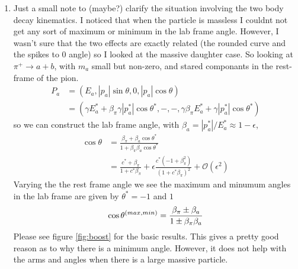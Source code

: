 \documentclass[11pt, a4paper]{article}
\begin{document}
\begin{enumerate}
\item Just a small note to (maybe?) clarify the situation involving the two body decay kinematics. I noticed that when the particle is massless I couldnt not get any sort of maximum or minimum in the lab frame angle. However, I wasn't sure that the two effects are exactly related (the rounded curve and the spikes to 0 angle) so I looked at the massive daughter case. So looking at $\pi^+ \rightarrow a+b$, with $m_a$ small but non-zero, and stared componants in the rest-frame of the pion.
	\begin{align}
		P_a &= (E_a, |p_a| \sin \theta, 0, |p_a| \cos\theta ) \\
		    &=(\gamma E_a^*+ \beta_\pi \gamma |p_a^*| \cos \theta^*, -,-,\gamma \beta_\pi E_a^* + \gamma |p_a^*| \cos \theta^*)
	\end{align}
	so we can construct the lab frame angle, with $\beta_a = |p_a^*|/E_a^* \approx 1 - \epsilon$, 
	\begin{align}
		\cos \theta &= \frac{\beta_\pi+\beta_a \cos \theta^*}{1+\beta_\pi \beta_a \cos \theta^*} \\
							       &= \frac{c^*+\beta_\pi}{1+c^* \beta_\pi}+\epsilon \frac{c^*(-1+\beta_\pi^2)}{(1+c^* \beta_\pi)^2} + \mathcal{O}(\epsilon^2)
	\end{align}
	Varying the the rest frame angle we see the maximum and minumum angles in the lab frame are given by $\theta^* = -1$ and $1$ 
	\begin{align}
		\cos \theta^{\text(max,min)} &=  \frac{\beta_\pi \pm \beta_a }{1 \pm \beta_\pi \beta_a} \\
	\end{align}
	Please see figure \ref{fig:boost} for the basic results. This gives a pretty good reason as to why there is a minimum angle. However, it does not help with the arms and angles when there is a large massive particle. 

	\end{enumerate}
\end{document}
